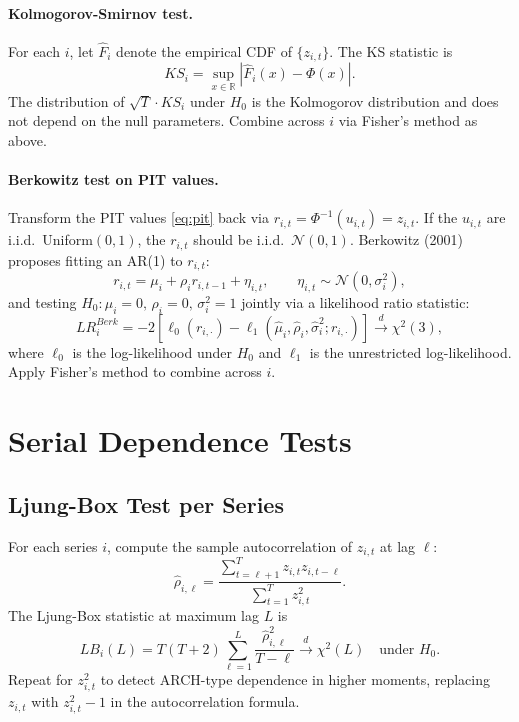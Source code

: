 \documentclass[12pt]{article}
\begin{document}
\paragraph{Kolmogorov-Smirnov test.}
For each $i$, let $\hat{F}_i$ denote the empirical CDF of $\{z_{i,t}\}$. The KS statistic is
\begin{equation}
    KS_i = \sup_{x \in \mathbb{R}} \left|\hat{F}_i(x) - \Phi(x)\right|.
\end{equation}
The distribution of $\sqrt{T} \cdot KS_i$ under $H_0$ is the Kolmogorov distribution and
does not depend on the null parameters. Combine across $i$ via Fisher's method as above.

\paragraph{Berkowitz test on PIT values.}
Transform the PIT values \eqref{eq:pit} back via $r_{i,t} = \Phi^{-1}(u_{i,t}) = z_{i,t}$.
If the $u_{i,t}$ are i.i.d.\ Uniform$(0,1)$, the $r_{i,t}$ should be i.i.d.\ $\mathcal{N}(0,1)$.
Berkowitz (2001) proposes fitting an AR(1) to $r_{i,t}$:
\begin{equation}
    r_{i,t} = \mu_i + \rho_i r_{i,t-1} + \eta_{i,t}, \qquad \eta_{i,t} \sim \mathcal{N}(0, \sigma_i^2),
\end{equation}
and testing $H_0: \mu_i = 0,\, \rho_i = 0,\, \sigma_i^2 = 1$ jointly via a likelihood ratio
statistic:
\begin{equation}
    LR_i^{Berk} = -2\left[\ell_0(r_{i,\cdot}) - \ell_1(\hat{\mu}_i, \hat{\rho}_i, \hat{\sigma}_i^2; r_{i,\cdot})\right]
    \overset{d}{\to} \chi^2(3),
\end{equation}
where $\ell_0$ is the log-likelihood under $H_0$ and $\ell_1$ is the unrestricted
log-likelihood. Apply Fisher's method to combine across $i$.

\section{Serial Dependence Tests}

\subsection{Ljung-Box Test per Series}

For each series $i$, compute the sample autocorrelation of $z_{i,t}$ at lag $\ell$:
\begin{equation}
    \hat{\rho}_{i,\ell} = \frac{\sum_{t=\ell+1}^T z_{i,t} z_{i,t-\ell}}
    {\sum_{t=1}^T z_{i,t}^2}.
\end{equation}
The Ljung-Box statistic at maximum lag $L$ is
\begin{equation}
    LB_i(L) = T(T+2) \sum_{\ell=1}^{L} \frac{\hat{\rho}_{i,\ell}^2}{T - \ell}
    \overset{d}{\to} \chi^2(L) \quad \text{under } H_0.
    \label{eq:lb}
\end{equation}
Repeat for $z_{i,t}^2$ to detect ARCH-type dependence in higher moments, replacing
$z_{i,t}$ with $z_{i,t}^2 - 1$ in the autocorrelation formula.
\end{document}
